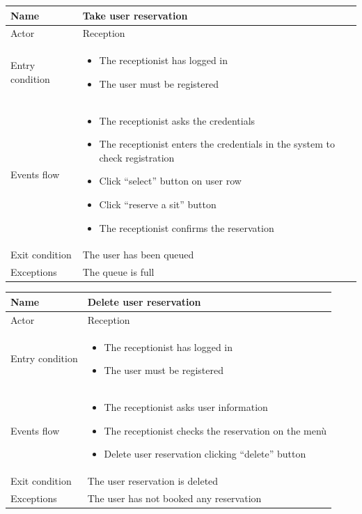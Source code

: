\begin{tabular}{|p{5cm} | p{7cm} | }
	\hline
	Name & Take user reservation \\
	\hline
	Actor & Reception \\
	\hline
	Entry condition &
	\begin{itemize}
		\item The receptionist has logged in 
		\item The user must be registered
	\end{itemize} \\
	\hline
	Events flow & 
	\begin{itemize}
		\item The receptionist asks the credentials
		\item The receptionist enters the credentials in the system to check registration
		\item Click “select” button on user row
		\item Click “reserve a sit” button 
		\item The receptionist confirms the reservation
	\end{itemize} \\
	\hline
	Exit condition &
	The user has been queued \\
	\hline 
	Exceptions & 
	The queue is full \\
	\hline
\end{tabular}

\begin{tabular}{|p{5cm} | p{7cm} | }
	\hline
	Name & Delete user reservation \\
	\hline
	Actor & Reception \\
	\hline
	Entry condition &
	\begin{itemize}
		\item The receptionist has logged in 
		\item The user must be registered
	\end{itemize} \\
	\hline
	Events flow & 
	\begin{itemize}
		\item The receptionist asks user information
		\item The receptionist checks the reservation on the menù
		\item Delete user reservation clicking “delete” button
	\end{itemize} \\
	\hline
	Exit condition &
	The user reservation is deleted \\
	\hline 
	Exceptions & 
	The user has not booked any reservation \\
	\hline
\end{tabular}

